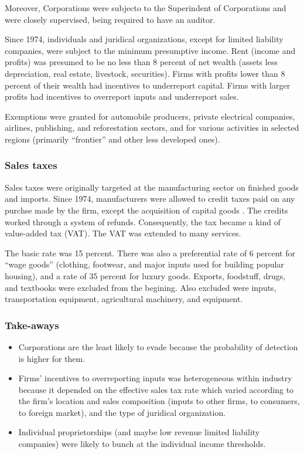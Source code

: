 \documentclass[
  12pt]{article}
\providecommand{\tightlist}{%
  \setlength{\itemsep}{0pt}\setlength{\parskip}{0pt}}\usepackage{longtable,booktabs,array}
\begin{document}
Moreover, Corporations were subjecto to the Superindent of Corporations
and were closely supervised, being required to have an auditor.

Since 1974, individuals and juridical organizations, except for limited
liability companies, were subject to the minimum presumptive income.
Rent (income and profits) was presumed to be no less than 8 percent of
net wealth (assets less depreciation, real estate, livestock,
securities). Firms with profits lower than 8 percent of their wealth had
incentives to underreport capital. Firms with larger profits had
incentives to overreport inputs and underreport sales.

Exemptions were granted for automobile producers, private electrical
companies, airlines, publishing, and reforestation sectors, and for
various activities in selected regions (primarily ``frontier'' and other
less developed ones).

\hypertarget{sales-taxes}{%
\subsubsection{Sales taxes}\label{sales-taxes}}

Sales taxes were originally targeted at the manufacturing sector on
finished goods and imports. Since 1974, manufacturers were allowed to
credit taxes paid on any purchse made by the firm, except the
acquisition of capital goods \citep{Perry1990}. The credits worked
through a system of refunds. Consequently, the tax became a kind of
value-added tax (VAT). The VAT was extended to many services.

The basic rate was 15 percent. There was also a preferential rate of 6
percent for ``wage goods'' (clothing, footwear, and major inputs used
for building popular housing), and a rate of 35 percent for luxury
goods. Exports, foodstuff, drugs, and textbooks were excluded from the
begining. Also excluded were inputs, transportation equipment,
agricultural machinery, and equipment.

\hypertarget{take-aways}{%
\subsubsection{Take-aways}\label{take-aways}}

\begin{itemize}
\tightlist
\item
  Corporations are the least likely to evade because the probability of
  detection is higher for them.
\item
  Firms' incentives to overreporting inputs was heterogeneous within
  industry because it depended on the effective sales tax rate which
  varied according to the firm's location and sales composition (inputs
  to other firms, to consumers, to foreign market), and the type of
  juridical organization.
\item
  Individual proprietorships (and maybe low revenue limited liability
  companies) were likely to bunch at the individual income thresholds.
\end{itemize}
\end{document}
